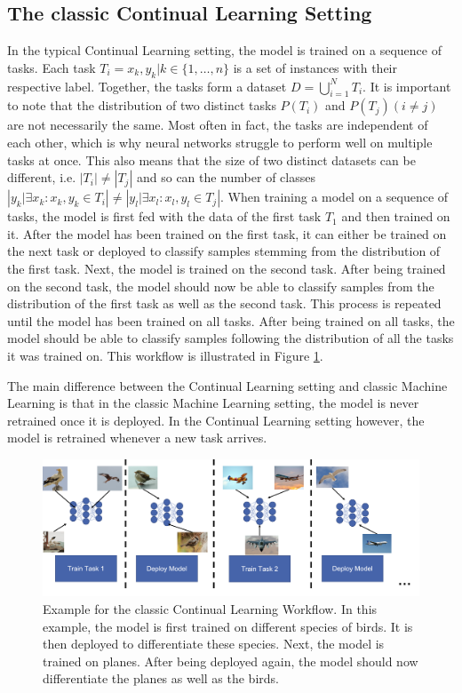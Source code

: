 \subsection{The classic Continual Learning Setting}
\label{sec:Methodology:CLSetting}
In the typical Continual Learning setting, the model is trained on a sequence of tasks. Each task $T_i = {x_k,y_k | k \in \{1,\ldots,n\}}$ is a set
of instances with their respective label. Together, the tasks form a dataset $D = \bigcup\limits_{i=1}^{N} T_i$. It is important to note that
the distribution of two distinct tasks $P(T_i)$  and $P(T_j) (i \neq j)$ are not necessarily the same. Most often in fact, the tasks are independent
of each other, which is why neural networks struggle to perform well on multiple tasks at once. This also means that the size of two distinct datasets
can be different, i.e. $|T_i| \neq |T_j|$ and so can the number of classes $|{y_k | \exists x_k: x_k,y_k \in T_i}| \neq |{y_l | \exists x_l: x_l,y_l
\in T_j}|$. When training a model on a sequence of tasks, the model is first fed with the data of the first task $T_1$ and then trained on it. 
After the model has been trained on the first task, it can either be trained on the next task or deployed to classify samples stemming from the
distribution of the first task. Next, the model is trained on the second task. After being trained on the second task, the model should now be able to
classify samples from the distribution of the first task as well as the second task. This process is repeated until the model has been trained on all
tasks. After being trained on all tasks, the model should be able to classify samples following the distribution of all the tasks it was trained on.
This workflow is illustrated in Figure \ref{fig:CLWorkflow}. \par
The main difference between the Continual Learning setting and classic Machine Learning is that in the classic Machine Learning setting, the model is never retrained
once it is deployed. In the Continual Learning setting however, the model is retrained whenever a new task arrives.

\begin{figure}[ht]
    \centering
    \includegraphics[width=.9\linewidth]{images/CL_workflow.png}
    \caption[Continual Learning Workflow]{Example for the classic Continual Learning Workflow. In this example, the model is first trained on different species of
    birds. It is then deployed to differentiate these species. Next, the model is trained on planes. After being deployed again, the model should now differentiate
    the planes as well as the birds.}
    \label{fig:CLWorkflow}
  \end{figure}

